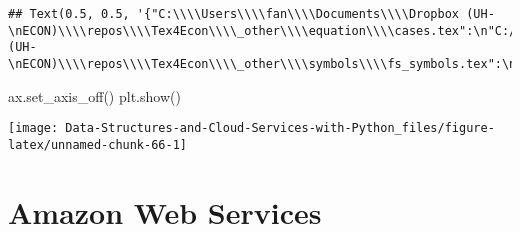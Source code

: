 \documentclass[
]{book}
\newenvironment{Shaded}{\begin{snugshade}}{\end{snugshade}}
\newcommand{\NormalTok}[1]{#1}
\begin{document}
\begin{verbatim}
## Text(0.5, 0.5, '{"C:\\\\Users\\\\fan\\\\Documents\\\\Dropbox (UH-\nECON)\\\\repos\\\\Tex4Econ\\\\_other\\\\equation\\\\cases.tex":\n"C:/Users/fan/Documents/cases.pdf",\n"C:\\\\Users\\\\fan\\\\Documents\\\\Dropbox (UH-\nECON)\\\\repos\\\\Tex4Econ\\\\_other\\\\symbols\\\\fs_symbols.tex":\n"C:/Users/fan/Documents/fs_symbols.pdf"}')
\end{verbatim}

\begin{Shaded}
\begin{Highlighting}[]
\NormalTok{ax.set\_axis\_off()}
\NormalTok{plt.show()}
\end{Highlighting}
\end{Shaded}

\begin{center}\texttt{[image: Data-Structures-and-Cloud-Services-with-Python\_files/figure-latex/unnamed-chunk-66-1]} \end{center}

\hypertarget{amazon-web-services}{%
\chapter{Amazon Web Services}\label{amazon-web-services}}
\end{document}
